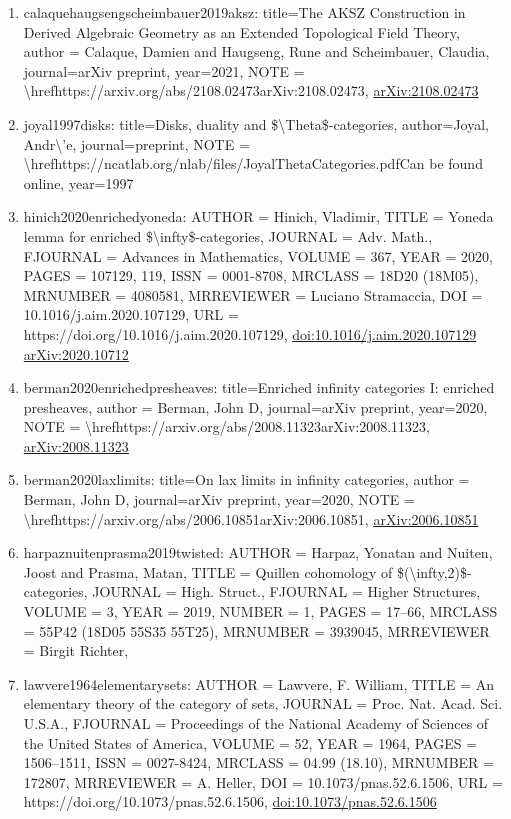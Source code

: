 \documentclass[11pt]{article}
\begin{document}
\begin{enumerate}[leftmargin=*]
  \item calaquehaugsengscheimbauer2019aksz: title=The AKSZ Construction in Derived Algebraic Geometry as an Extended Topological Field Theory, author = Calaque, Damien and Haugseng, Rune and Scheimbauer, Claudia, journal=arXiv preprint, year=2021, NOTE = \textbackslash{}hrefhttps://arxiv.org/abs/2108.02473arXiv:2108.02473, \href{https://arxiv.org/abs/2108.02473}{arXiv:2108.02473}
  \item joyal1997disks: title=Disks, duality and \$\textbackslash{}Theta\$-categories, author=Joyal, Andr\textbackslash{}'e, journal=preprint, NOTE = \textbackslash{}hrefhttps://ncatlab.org/nlab/files/JoyalThetaCategories.pdfCan be found online, year=1997
  \item hinich2020enrichedyoneda: AUTHOR = Hinich, Vladimir, TITLE = Yoneda lemma for enriched \$\textbackslash{}infty\$-categories, JOURNAL = Adv. Math., FJOURNAL = Advances in Mathematics, VOLUME = 367, YEAR = 2020, PAGES = 107129, 119, ISSN = 0001-8708, MRCLASS = 18D20 (18M05), MRNUMBER = 4080581, MRREVIEWER = Luciano Stramaccia, DOI = 10.1016/j.aim.2020.107129, URL = https://doi.org/10.1016/j.aim.2020.107129, \href{https://doi.org/10.1016/j.aim.2020.107129}{doi:10.1016/j.aim.2020.107129} \href{https://arxiv.org/abs/2020.10712}{arXiv:2020.10712}
  \item berman2020enrichedpresheaves: title=Enriched infinity categories I: enriched presheaves, author = Berman, John D, journal=arXiv preprint, year=2020, NOTE = \textbackslash{}hrefhttps://arxiv.org/abs/2008.11323arXiv:2008.11323, \href{https://arxiv.org/abs/2008.11323}{arXiv:2008.11323}
  \item berman2020laxlimits: title=On lax limits in infinity categories, author = Berman, John D, journal=arXiv preprint, year=2020, NOTE = \textbackslash{}hrefhttps://arxiv.org/abs/2006.10851arXiv:2006.10851, \href{https://arxiv.org/abs/2006.10851}{arXiv:2006.10851}
  \item harpaznuitenprasma2019twisted: AUTHOR = Harpaz, Yonatan and Nuiten, Joost and Prasma, Matan, TITLE = Quillen cohomology of \$(\textbackslash{}infty,2)\$-categories, JOURNAL = High. Struct., FJOURNAL = Higher Structures, VOLUME = 3, YEAR = 2019, NUMBER = 1, PAGES = 17--66, MRCLASS = 55P42 (18D05 55S35 55T25), MRNUMBER = 3939045, MRREVIEWER = Birgit Richter,
  \item lawvere1964elementarysets: AUTHOR = Lawvere, F. William, TITLE = An elementary theory of the category of sets, JOURNAL = Proc. Nat. Acad. Sci. U.S.A., FJOURNAL = Proceedings of the National Academy of Sciences of the United States of America, VOLUME = 52, YEAR = 1964, PAGES = 1506--1511, ISSN = 0027-8424, MRCLASS = 04.99 (18.10), MRNUMBER = 172807, MRREVIEWER = A. Heller, DOI = 10.1073/pnas.52.6.1506, URL = https://doi.org/10.1073/pnas.52.6.1506, \href{https://doi.org/10.1073/pnas.52.6.1506}{doi:10.1073/pnas.52.6.1506}

\end{enumerate}
\end{document}
